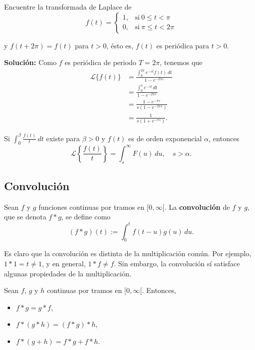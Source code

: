 \begin{ejemplo}
    Encuentre la transformada de Laplace de
    $$f(t) = \left\{ \begin{array}{cl}
     1,& \text{si} ~ 0 \leq t < \pi  \\
     0,& \text{si} ~ \pi \leq t < 2\pi
    \end{array} \right.$$

    y $f(t+ 2\pi) = f(t)$ para $t > 0$, ésto es, $f(t)$ es periódica para $t > 0$.

    \textbf{Solución:} Como $f$ es periódica de periodo $T = 2\pi$, tenemos que
    \begin{align*}
        \mathcal{L}\{f(t)\} &= \frac{\int_0^{2\pi} e^{-st} f(t) \,dt}{1-e^{-2\pi s}} \\
        &= \frac{\int_0^{\pi} e^{-st}\,dt}{1-e^{-2\pi s}} \\
        &= \frac{1-e^{-\pi s}}{s(1-e^{-2\pi s})} \\
        &= \frac{1}{s(1+e^{-\pi s})}.
    \end{align*}
\end{ejemplo}

\begin{teorema}
   Si $\int_0^{\beta} \frac{f(t)}{t} \,dt$ existe para $\beta > 0$ y $f(t)$ es de orden exponencial $\alpha$, entonces
   $$\mathcal{L}\left\{\frac{f(t)}{t}\right\} = \int_s^{\infty} F(u) \,du, \quad s > \alpha.$$
\end{teorema}

\subsection{Convolución}

\begin{defi}
   Sean $f$ y $g$ funciones continuas por tramos en $[0, \infty[$. La \textbf{convolución} de $f$ y $g$, que se denota $f*g$, se define como
\begin{equation*}
(f*g)(t) := \int_0^t f(t-u)g(u) \, du.
\end{equation*}  
\end{defi}

Es claro que la convolución es distinta de la multiplicación común. Por ejemplo, $1*1 = t \neq 1$, y en general, $1*f \neq f$. Sin embargo, la convolución sí satisface algunas propiedades de la multiplicación.

\begin{teorema}
Sean $f$, $g$ y $h$ continuas por tramos en $[0,  \infty[$. Entonces,

\begin{itemize}
\item[(i)] $f*g = g*f$,

\item[(ii)] $f*(g*h) = (f*g)*h$,  

\item[(iii)] $f*(g+h) = f*g + f*h$. 
\end{itemize} 
\end{teorema}

